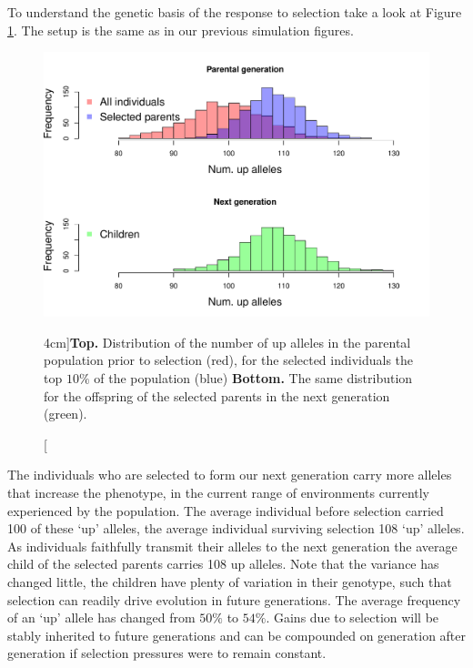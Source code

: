 To understand the genetic basis of the response to selection take a
look at Figure \ref{Fig:Response_num_alleles}. The setup is the same as in our previous
simulation figures.
\begin{figure}
\begin{center}
\includegraphics[width=\textwidth]{figures/QT3_w_genosums.pdf}
\end{center}
\caption[][4cm]{{\bf Top.} Distribution of the number of up alleles in the parental population
  prior to selection (red), for the selected individuals the top
  $10\%$ of the population (blue) {\bf Bottom.}  The same distribution
for the offspring of the selected parents in the next generation
(green). }  \label{Fig:Response_num_alleles}
\end{figure}
 The individuals who are selected to form our next generation carry
 more alleles that increase the phenotype, in the current range of
 environments currently experienced by the population. The average
 individual before selection carried 100 of these `up' alleles, the average
 individual surviving selection 108 `up' alleles. As individuals
 faithfully transmit their alleles to the next generation the average
 child of the selected parents carries 108 up alleles. Note that the
 variance has changed little, the children have plenty of variation in
 their genotype, such that selection can readily drive evolution in future generations. The average frequency of an `up' allele has changed
 from $50\%$ to $54\%$. Gains due to selection will be stably
 inherited to future generations and can be compounded on generation
 after generation if selection pressures were to remain constant.


